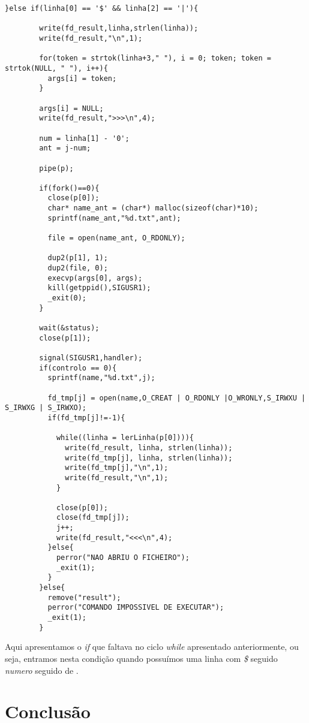 \documentclass{report}
\begin{document}
\begin{verbatim}
}else if(linha[0] == '$' && linha[2] == '|'){

        write(fd_result,linha,strlen(linha));
        write(fd_result,"\n",1);

        for(token = strtok(linha+3," "), i = 0; token; token = strtok(NULL, " "), i++){
          args[i] = token;
        }
          
        args[i] = NULL;
        write(fd_result,">>>\n",4);

        num = linha[1] - '0';
        ant = j-num;
        
        pipe(p); 
        
        if(fork()==0){
          close(p[0]);
          char* name_ant = (char*) malloc(sizeof(char)*10);
          sprintf(name_ant,"%d.txt",ant);

          file = open(name_ant, O_RDONLY);

          dup2(p[1], 1);
          dup2(file, 0);
          execvp(args[0], args);
          kill(getppid(),SIGUSR1);
          _exit(0);
        }
      
        wait(&status);
        close(p[1]);

        signal(SIGUSR1,handler);
        if(controlo == 0){
          sprintf(name,"%d.txt",j);
        
          fd_tmp[j] = open(name,O_CREAT | O_RDONLY |O_WRONLY,S_IRWXU | S_IRWXG | S_IRWXO);
          if(fd_tmp[j]!=-1){
            
            while((linha = lerLinha(p[0]))){
              write(fd_result, linha, strlen(linha));
              write(fd_tmp[j], linha, strlen(linha));
              write(fd_tmp[j],"\n",1);
              write(fd_result,"\n",1);
            } 

            close(p[0]);
            close(fd_tmp[j]);
            j++;
            write(fd_result,"<<<\n",4);
          }else{
            perror("NAO ABRIU O FICHEIRO");
            _exit(1);
          }
        }else{
          remove("result");
          perror("COMANDO IMPOSSIVEL DE EXECUTAR");
          _exit(1);
        } 
\end{verbatim} 

  Aqui apresentamos o \textit{if} que faltava no ciclo \textit{while} apresentado anteriormente, ou seja, entramos nesta condição quando possuímos uma linha com \textit{\$} seguido \textit{numero} seguido de \textit{}. 

\chapter{Conclusão} \label{concl}
 
\end{document}
